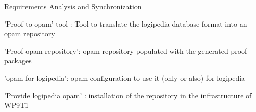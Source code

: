 \begin{workpackage}[id=access,wphases=0-48,type=MGT,
  short=Access,%
  title={Access to the infrastructure},
  lead=Inr,
  InrRM=28,
  OcaRM=6]
\begin{tasklist}
\end{tasklist}

\begin{wpdelivs}
  \begin{wpdeliv}[due=3,miles=startup,id=requirements,dissem=PU,nature=DEM,lead=Inr]
      {Requirements Analysis and Synchronization}
  \end{wpdeliv}
  \begin{wpdeliv}[due=2,miles=???,id=acessopamtool,dissem=PU,nature=DEM,lead=Oca]
      {'Proof to opam' tool : Tool to translate the logipedia database format into an opam repository}
  \end{wpdeliv}
  \begin{wpdeliv}[due=1,miles=???,id=acessopamrepo,dissem=PU,nature=DEM,lead=Oca]
      {'Proof opam repository': opam repository populated with the generated proof packages }
  \end{wpdeliv}
  \begin{wpdeliv}[due=1,miles=???,id=accessopamconfig,dissem=PU,nature=DEM,lead=Oca]
    {'opam for logipedia': opam configuration to use it (only or also) for logipedia}
  \end{wpdeliv}
  \begin{wpdeliv}[due=1,miles=???,id=accessopam,dissem=PU,nature=DEM,lead=Oca]
    {'Provide logipedia opam' : installation of the repository in the infrastructure of WP9T1 }
  \end{wpdeliv}
\end{wpdelivs}
\end{workpackage}


